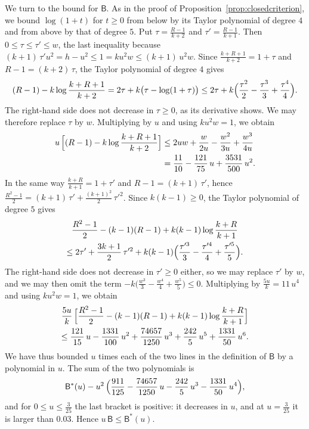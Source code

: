 \documentclass{amsart}
\theoremstyle{definition}
\theoremstyle{remark}
\numberwithin{equation}{section}
\begin{document}
We turn to the bound for $\mathsf{B}$. As in the proof of Proposition~\ref{prop:closedcriterion}, we bound $\log(1+t)$ for $t\ge 0$ from below by its Taylor polynomial of degree $4$ and from above by that of degree $5$. Put $\tau=\frac{R-1}{k+2}$ and $\tau'=\frac{R-1}{k+1}$. Then $0\le\tau\le\tau'\le w$, the last inequality because $(k+1)\,\tau'u^2=h-u^2\le 1=ku^2w\le(k+1)\,u^2w$. Since $\frac{k+R+1}{k+2}=1+\tau$ and $R-1=(k+2)\,\tau$, the Taylor polynomial of degree $4$ gives
\[
(R-1)-k\log\frac{k+R+1}{k+2}=2\tau+k\bigl(\tau-\log(1+\tau)\bigr)\le 2\tau+k\Bigl(\frac{\tau^2}{2}-\frac{\tau^3}{3}+\frac{\tau^4}{4}\Bigr).
\]
The right-hand side does not decrease in $\tau\ge 0$, as its derivative shows. We may therefore replace $\tau$ by $w$. Multiplying by $u$ and using $ku^2w=1$, we obtain
\begin{align*}
u\,\Bigl[(R-1)-k\log\frac{k+R+1}{k+2}\Bigr]&\le 2uw+\frac{w}{2u}-\frac{w^2}{3u}+\frac{w^3}{4u}\\
&=\frac{11}{10}-\frac{121}{75}\,u+\frac{3531}{500}\,u^2.
\end{align*}
In the same way $\frac{k+R}{k+1}=1+\tau'$ and $R-1=(k+1)\,\tau'$, hence $\frac{R^2-1}{2}=(k+1)\,\tau'+\frac{(k+1)^2}{2}\,\tau'^2$. Since $k(k-1)\ge 0$, the Taylor polynomial of degree $5$ gives
\begin{multline*}
\frac{R^2-1}{2}-(k-1)(R-1)+k(k-1)\log\frac{k+R}{k+1}\\
\le 2\tau'+\frac{3k+1}{2}\,\tau'^2+k(k-1)\Bigl(\frac{\tau'^3}{3}-\frac{\tau'^4}{4}+\frac{\tau'^5}{5}\Bigr).
\end{multline*}
The right-hand side does not decrease in $\tau'\ge 0$ either, so we may replace $\tau'$ by $w$, and we may then omit the term $-k\bigl(\frac{w^3}{3}-\frac{w^4}{4}+\frac{w^5}{5}\bigr)\le 0$. Multiplying by $\frac{5u}{k}=11\,u^4$ and using $ku^2w=1$, we obtain
\begin{multline*}
\frac{5u}{k}\,\Bigl[\frac{R^2-1}{2}-(k-1)(R-1)+k(k-1)\log\frac{k+R}{k+1}\Bigr]\\
\le\frac{121}{15}\,u-\frac{1331}{100}\,u^2+\frac{74657}{1250}\,u^3+\frac{242}{5}\,u^5+\frac{1331}{50}\,u^6.
\end{multline*}
We have thus bounded $u$ times each of the two lines in the definition of $\mathsf{B}$ by a polynomial in $u$. The sum of the two polynomials is
\[
\mathsf{B}^{*}(u)-u^2\,\Bigl(\frac{911}{125}-\frac{74657}{1250}\,u-\frac{242}{5}\,u^3-\frac{1331}{50}\,u^4\Bigr),
\]
and for $0\le u\le\frac{3}{25}$ the last bracket is positive: it decreases in $u$, and at $u=\frac{3}{25}$ it is larger than $0.03$. Hence $u\,\mathsf{B}\le\mathsf{B}^{*}(u)$.
\end{document}
